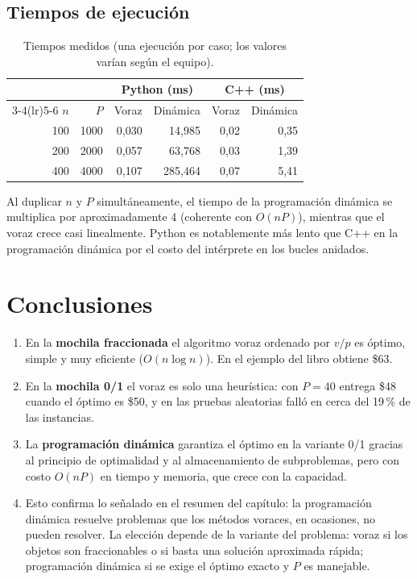 \documentclass[12pt,a4paper]{article}
\begin{document}
\subsection{Tiempos de ejecución}
\begin{table}[H]
\centering
\begin{tabular}{rrrrrr}
\toprule
 & & \multicolumn{2}{c}{Python (ms)} & \multicolumn{2}{c}{C++ (ms)} \\
\cmidrule(lr){3-4}\cmidrule(lr){5-6}
$n$ & $P$ & Voraz & Dinámica & Voraz & Dinámica \\
\midrule
100 & 1000 & 0,030 & 14,985 & 0,02 & 0,35 \\
200 & 2000 & 0,057 & 63,768 & 0,03 & 1,39 \\
400 & 4000 & 0,107 & 285,464 & 0,07 & 5,41 \\
\bottomrule
\end{tabular}
\caption{Tiempos medidos (una ejecución por caso; los valores varían según el equipo).}
\end{table}
Al duplicar $n$ y $P$ simultáneamente, el tiempo de la programación dinámica se multiplica por aproximadamente 4 (coherente con $O(nP)$), mientras que el voraz crece casi linealmente. Python es notablemente más lento que C++ en la programación dinámica por el costo del intérprete en los bucles anidados.

\section{Conclusiones}
\begin{enumerate}
  \item En la \textbf{mochila fraccionada} el algoritmo voraz ordenado por $v/p$ es óptimo, simple y muy eficiente ($O(n\log n)$). En el ejemplo del libro obtiene \$63.
  \item En la \textbf{mochila 0/1} el voraz es solo una heurística: con $P=40$ entrega \$48 cuando el óptimo es \$50, y en las pruebas aleatorias falló en cerca del 19\,\% de las instancias.
  \item La \textbf{programación dinámica} garantiza el óptimo en la variante 0/1 gracias al principio de optimalidad y al almacenamiento de subproblemas, pero con costo $O(nP)$ en tiempo y memoria, que crece con la capacidad.
  \item Esto confirma lo señalado en el resumen del capítulo: la programación dinámica resuelve problemas que los métodos voraces, en ocasiones, no pueden resolver. La elección depende de la variante del problema: voraz si los objetos son fraccionables o si basta una solución aproximada rápida; programación dinámica si se exige el óptimo exacto y $P$ es manejable.
\end{enumerate}
\end{document}
